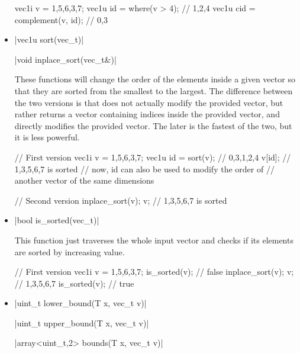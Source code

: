 \documentclass[12pt]{report}
\newenvironment{example}
{
    \begin{mdframed}[style=example,frametitle={Example}]
}
{
    \end{mdframed}
}
\begin{document}
\begin{itemize}
\begin{example}
\begin{cppcode}
vec1i v = {1,5,6,3,7};
vec1u id = where(v > 4); // {1,2,4}
vec1u cid = complement(v, id); // {0,3}
\end{cppcode}
\end{example}

\item \cppinline|vec1u sort(vec_t)| 

\cppinline|void inplace_sort(vec_t&)| 

These functions will change the order of the elements inside a given vector so that they are sorted from the smallest to the largest. The difference between the two versions is that  does not actually modify the provided vector, but rather returns a vector containing indices inside the provided vector, and  directly modifies the provided vector. The later is the fastest of the two, but it is less powerful.

\begin{example}
\begin{cppcode}
// First version
vec1i v = {1,5,6,3,7};
vec1u id = sort(v); // {0,3,1,2,4}
v[id]; // {1,3,5,6,7} is sorted
// now, id can also be used to modify the order of
// another vector of the same dimensions

// Second version
inplace_sort(v);
v; // {1,3,5,6,7} is sorted
\end{cppcode}
\end{example}

\item \cppinline|bool is_sorted(vec_t)| 

This function just traverses the whole input vector and checks if its elements are sorted by increasing value.

\begin{example}
\begin{cppcode}
// First version
vec1i v = {1,5,6,3,7};
is_sorted(v); // false
inplace_sort(v);
v; // {1,3,5,6,7}
is_sorted(v); // true
\end{cppcode}
\end{example}

\item \cppinline|uint_t lower_bound(T x, vec_t v)| 

\cppinline|uint_t upper_bound(T x, vec_t v)| 

\cppinline|array<uint_t,2> bounds(T x, vec_t v)| 


\end{itemize}
\end{document}
